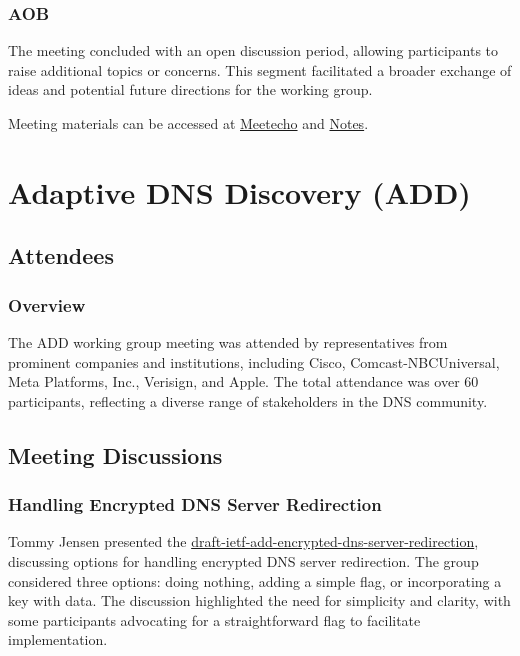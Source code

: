 \documentclass{article}
\begin{document}
\subsubsection{AOB}

The meeting concluded with an open discussion period, allowing participants to raise additional topics or concerns. This segment facilitated a broader exchange of ideas and potential future directions for the working group.

Meeting materials can be accessed at \href{https://meetecho.ietf.org/lite/?group=acme}{Meetecho} and \href{https://notes.ietf.org/notes-ietf-121-acme}{Notes}.




\newpage

\section{Adaptive DNS Discovery (ADD)}

\subsection{Attendees}
\subsubsection{Overview}
The ADD working group meeting was attended by representatives from prominent companies and institutions, including Cisco, Comcast-NBCUniversal, Meta Platforms, Inc., Verisign, and Apple. The total attendance was over 60 participants, reflecting a diverse range of stakeholders in the DNS community.

\subsection{Meeting Discussions}

\subsubsection{Handling Encrypted DNS Server Redirection}
Tommy Jensen presented the \href{https://datatracker.ietf.org/doc/html/draft-ietf-add-encrypted-dns-server-redirection}{draft-ietf-add-encrypted-dns-server-redirection}, discussing options for handling encrypted DNS server redirection. The group considered three options: doing nothing, adding a simple flag, or incorporating a key with data. The discussion highlighted the need for simplicity and clarity, with some participants advocating for a straightforward flag to facilitate implementation.
\end{document}
